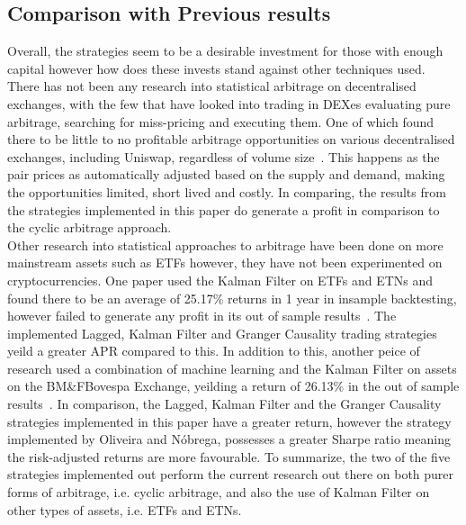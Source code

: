 \subsection{Comparison with Previous results}
Overall, the strategies seem to be a desirable investment for those with enough capital however how does these invests stand against other techniques used. There has not been any research into statistical arbitrage on decentralised exchanges, with the few that have looked into trading in DEXes evaluating pure arbitrage, searching for miss-pricing and executing them. One of which found there to be little to no profitable arbitrage opportunities on various decentralised exchanges, including Uniswap, regardless of volume size~\cite{boonpeam2021arbitrage}. This happens as the pair prices as automatically adjusted based on the supply and demand, making the opportunities limited, short lived and costly. In comparing, the results from the strategies implemented in this paper do generate a profit in comparison to the cyclic arbitrage approach.
\\[3mm]
Other research into statistical approaches to arbitrage have been done on more mainstream assets such as ETFs however, they have not been experimented on cryptocurrencies. One paper used the Kalman Filter on ETFs and ETNs and found there to be an average of 25.17\% returns in 1 year in insample backtesting, however failed to generate any profit in its out of sample results~\cite{dempsey_market_2017}. The implemented Lagged, Kalman Filter and Granger Causality trading strategies yeild a greater APR compared to this. In addition to this, another peice of research used a combination of machine learning and the Kalman Filter on assets on the BM\&FBovespa Exchange, yeilding a return of 26.13\% in the out of sample results~\cite{6974093}. In comparison, the Lagged, Kalman Filter and the Granger Causality strategies implemented in this paper have a greater return, however the strategy implemented by Oliveira and Nóbrega, possesses a greater Sharpe ratio meaning the risk-adjusted returns are more favourable. To summarize, the two of the five strategies implemented out perform the current research out there on both purer forms of arbitrage, i.e. cyclic arbitrage, and also the use of Kalman Filter on other types of assets, i.e. ETFs and ETNs.
